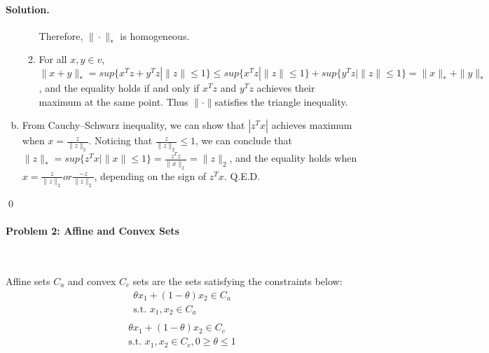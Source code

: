 \documentclass[a4paper]{article}
\newenvironment{solution}
{\color{blue} \paragraph{Solution.}}
{\newline \qed}
\begin{document}
\begin{solution}
\begin{enumerate}[a)]
\begin{enumerate}[1)]
                Therefore, $\|\cdot\|_*$ is homogeneous.
                \item For all $x,y\in v$, $\|x+y\|_*=sup\{x^Tz+y^Tz|\|z\|\leq 1\}\leq sup\{x^Tz|\|z\|\leq 1\}+sup\{y^Tz|\|z\|\leq 1\}=\|x\|_*+\|y\|_*$, and the equality holds if and only if $x^Tz$ and $y^Tz$ achieves their maximum at the same point. Thus $\|\cdot\|$satisfies the triangle inequality.
            \end{enumerate}
        \item From Cauchy–Schwarz inequality, we can show that $|z^Tx|$ achieves maximum when $x=\frac{z}{\|z\|_2}$. Noticing that $\frac{z}{\|z\|_2}\leq 1$, we can conclude that$\|z\|_*=sup\{z^Tx|\|x\|\leq 1\}=\frac{z^Tz}{\|x\|_2}=\|z\|_2$, and the equality holds when $x=\frac{z}{\|z\|_2} or \frac{-z}{\|z\|_2}$, depending on the sign of $z^Tx$. Q.E.D.
    \end{enumerate}
\end{solution}
\paragraph{Problem 2: Affine and Convex Sets}
~

Affine sets $C_{a}$ and convex $C_{c}$ sets are the sets satisfying the constraints below:
\begin{equation}
\begin{aligned}
    \theta x_1 + (1-\theta)x_2 \in C_{a}\\
    \text{s.t. } x_1, x_2 \in C_{a}\\
\end{aligned}
\end{equation}
\begin{equation}
\begin{aligned}
    \theta x_1 + (1-\theta)x_2 \in C_{c}\\
    \text{s.t. } x_1, x_2 \in C_{c}, 0 \geq \theta \leq 1\\
\end{aligned}
\end{equation}
\end{document}
